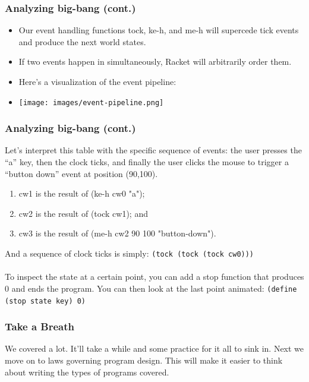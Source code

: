 \documentclass{beamer}
\begin{document}
\begin{frame}
  \frametitle{Analyzing big-bang (cont.)}
  \begin{itemize}
  \item<1-> Our event handling functions tock, ke-h, and me-h will supercede tick events and produce the next world states.
  \item<2-> If two events happen in simultaneously, Racket will arbitrarily order them.
  \item<3-> Here's a visualization of the event pipeline:
  \item<4-> \texttt{[image: images/event-pipeline.png]}
  \end{itemize}
\end{frame}


\begin{frame}
  \frametitle{Analyzing big-bang (cont.)}
  Let’s interpret this table with the specific sequence of events: the user presses the “a” key, then the clock ticks, and finally the user clicks the mouse to trigger a “button down” event at position (90,100).
  \begin{enumerate}
  \item<2-> cw1 is the result of (ke-h cw0 "a");
  \item<3-> cw2 is the result of (tock cw1); and
  \item<4-> cw3 is the result of (me-h cw2 90 100 "button-down").
  \end{enumerate}
  \pause
  And a sequence of clock ticks is simply:
  \texttt{(tock (tock (tock cw0)))}
  \pause
  \\\\
  To inspect the state at a certain point, you can add a stop function that
  produces 0 and ends the program. You can then look at the last point animated:
  \texttt{(define (stop state key) 0)}
\end{frame}

\begin{frame}
  \frametitle{Take a Breath}
  \huge We covered a lot. It'll take a while and some practice  for it all to sink in. Next we move on to laws governing program design. This will make it easier
  to think about writing the types of programs covered.
\end{frame}
\end{document}
